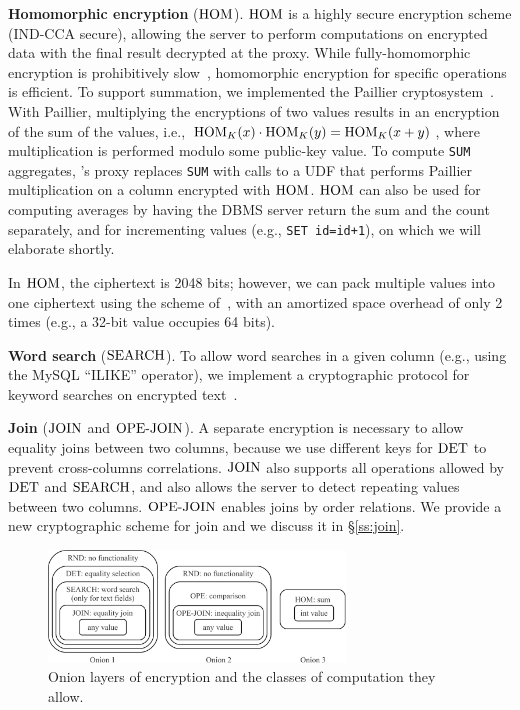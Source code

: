 \textbf{Homomorphic encryption} ($\textrm{HOM}$)\@. $\textrm{HOM}$ is a highly secure
encryption scheme (IND-CCA secure), allowing the server to perform
computations on encrypted data with the final result decrypted at the
proxy. While fully-homomorphic encryption is prohibitively
slow~\cite{trillion}, homomorphic encryption for specific operations
is efficient.  To support summation, we implemented the Paillier
cryptosystem~\cite{Paillier99}.  With Paillier, multiplying the
encryptions of two values results in an encryption of the sum of the
values, i.e., $\textrm{HOM}_K(x) \cdot \textrm{HOM}_K(y) = \textrm{HOM}_K(x+y)$, where
multiplication is performed modulo some public-key value.  To compute
{\tt SUM} aggregates, \name's proxy replaces {\tt SUM} with calls to a
UDF that performs Paillier multiplication on a column encrypted with
$\textrm{HOM}$.  $\textrm{HOM}$ can also be used for computing averages by having the
DBMS server return the sum and the count separately, and for
incrementing values (e.g., {\tt SET id=id+1}), on which we will
elaborate shortly.

In $\textrm{HOM}$, the ciphertext is 2048 bits; however, we can pack
multiple values into one ciphertext using the scheme
of~\cite{GeZ07}, with an amortized space overhead of only 2 times
(e.g., a 32-bit value occupies 64 bits).

\textbf{Word search} ($\textrm{SEARCH}$)\@.  To allow word searches in a given
column (e.g., using the MySQL ``ILIKE'' operator), we implement a
cryptographic protocol for keyword searches on encrypted
text~\cite{Dawn-Song-Search-2000, amanatidis-boldyreva-o'neill}.

\textbf{Join} ($\textrm{JOIN}$ and $\textrm{OPE-JOIN}$)\@.  A separate encryption
is necessary to allow equality joins between two columns, because we
use different keys for $\textrm{DET}$ to prevent cross-columns correlations.   $\textrm{JOIN}$ also supports all operations allowed by $\textrm{DET}$ and
$\textrm{SEARCH}$, and also allows the server to detect repeating values
between two columns.  $\textrm{OPE-JOIN}$ enables joins by order relations. We provide a new cryptographic scheme for join and we discuss it in \S\ref{ss:join}.

\begin{figure}[t!]
\centering
\includegraphics[width=3.1in]{fig/storage.pdf}
\caption{Onion layers of encryption and the classes of computation they allow.}
\label{fig:onion}
\end{figure}

